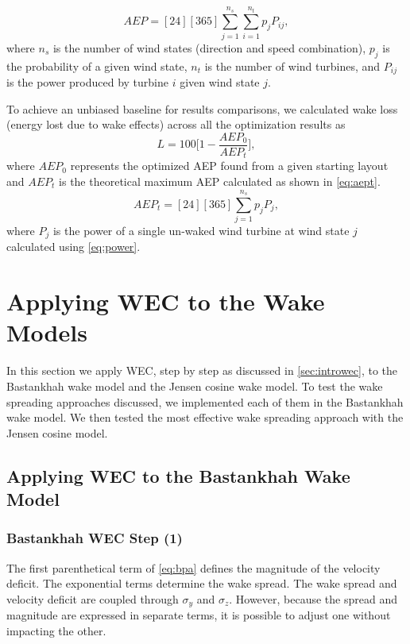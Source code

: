 \documentclass[journal abbreviation, manuscript]{copernicus}
\begin{document}
	\begin{equation} \label{eq:aep}
		AEP = [24][365]\sum_{j=1}^{n_s} \sum_{i=1}^{n_t} p_j P_{ij},
	\end{equation}
	where $n_s$ is the number of wind states (direction and speed combination), $p_j$ is the probability of a given wind state, $n_t$ is the number of wind turbines, and $P_{ij}$ is the power produced by turbine $i$ given wind state $j$.
	
	To achieve an unbiased baseline for results comparisons, we calculated wake loss (energy lost due to wake effects) across all the optimization results as
	\begin{equation} \label{eq:wake_loss}
		L = 100 \bigg[ 1 - \frac{AEP_0}{AEP_t} \bigg],
	\end{equation}
	where $AEP_0$ represents the optimized AEP found from a given starting layout and $AEP_t$ is the theoretical maximum AEP calculated as shown in \ref{eq:aept}. 
	\begin{equation} \label{eq:aept}
		AEP_t = [24][365]\sum_{j=1}^{n_s}p_j P_j,
	\end{equation}
	where $P_j$ is the power of a single un-waked wind turbine at wind state $j$ calculated using \ref{eq:power}. 
	
	\section{Applying WEC to the  Wake Models} \label{sec:application}
	In this section we apply WEC, step by step as discussed in \ref{sec:introwec}, to the Bastankhah wake model and the Jensen cosine wake model. To test the wake spreading approaches discussed, we implemented each of them in the Bastankhah  wake model. We then tested the most effective wake spreading approach with the Jensen cosine model.
	
	\subsection{Applying WEC to the Bastankhah Wake Model}
	
	\subsubsection{Bastankhah WEC Step (1)}
	The first parenthetical term of \ref{eq:bpa} defines the magnitude of the velocity deficit. The exponential terms determine the wake spread. The wake spread and velocity deficit are coupled through $\sigma_y$ and $\sigma_z$. However, because the spread and magnitude are expressed in separate terms, it is possible to adjust one without impacting the other. 
	
\end{document}
